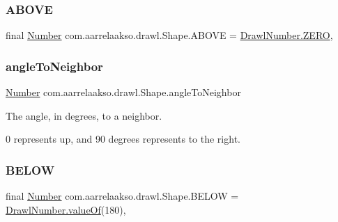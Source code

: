 \subsubsection{\texorpdfstring{A\+B\+O\+VE}{ABOVE}}
{\footnotesize\ttfamily final \hyperlink{interfacecom_1_1aarrelaakso_1_1drawl_1_1_number}{Number} com.\+aarrelaakso.\+drawl.\+Shape.\+A\+B\+O\+VE = \hyperlink{classcom_1_1aarrelaakso_1_1drawl_1_1_drawl_number_ae79e88954ed30a7f939cc62836fdc75c}{Drawl\+Number.\+Z\+E\+RO}\hspace{0.3cm}{\ttfamily [static]}, {\ttfamily [private]}}

\mbox{\label{classcom_1_1aarrelaakso_1_1drawl_1_1_shape_a0281d9f3d35d7ff5db2be3c3f9362c9f}} 
\subsubsection{\texorpdfstring{angle\+To\+Neighbor}{angleToNeighbor}}
{\footnotesize\ttfamily \hyperlink{interfacecom_1_1aarrelaakso_1_1drawl_1_1_number}{Number} com.\+aarrelaakso.\+drawl.\+Shape.\+angle\+To\+Neighbor\hspace{0.3cm}{\ttfamily [private]}}



The angle, in degrees, to a neighbor. 

0 represents up, and 90 degrees represents to the right. \mbox{\label{classcom_1_1aarrelaakso_1_1drawl_1_1_shape_af670d34e6a0155ea0c350312d8ebc39f}} 
\subsubsection{\texorpdfstring{B\+E\+L\+OW}{BELOW}}
{\footnotesize\ttfamily final \hyperlink{interfacecom_1_1aarrelaakso_1_1drawl_1_1_number}{Number} com.\+aarrelaakso.\+drawl.\+Shape.\+B\+E\+L\+OW = \hyperlink{classcom_1_1aarrelaakso_1_1drawl_1_1_drawl_number_a368da87af7b1b38bd5185715afadcad6}{Drawl\+Number.\+value\+Of}(180)\hspace{0.3cm}{\ttfamily [static]}, {\ttfamily [private]}}

